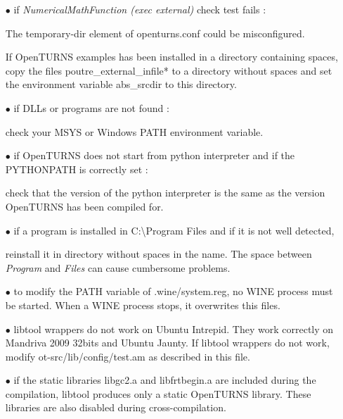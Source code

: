 \begin{itemize}
\item[$\bullet$]   if \emph{NumericalMathFunction (exec external)} check test fails :

The temporary-dir element of openturns.conf could be misconfigured.

If OpenTURNS examples has been installed in a directory containing spaces, copy the files poutre\_external\_infile* to a directory without spaces and set the environment variable abs\_srcdir to this directory.

\item[$\bullet$]   if DLLs or programs are not found :

check your MSYS or Windows PATH environment variable.
\item[$\bullet$]   if OpenTURNS does not start from python interpreter and if the PYTHONPATH is correctly set :

check that the version of the python interpreter is the same as the version OpenTURNS has been compiled for.
\item[$\bullet$]   if a program is installed in C:\textbackslash Program Files and if it is not well detected,

reinstall it in directory without spaces in the name. The space between \emph{Program} and \emph{Files} can cause cumbersome problems.

\item[$\bullet$]   to modify the PATH variable of .wine/system.reg, no WINE process must be started. When a WINE process stops, it overwrites this files.

\item[$\bullet$]   libtool wrappers do not work on Ubuntu Intrepid. They work correctly on Mandriva 2009 32bits and Ubuntu Jaunty. If libtool wrappers do not work, modify ot-src/lib/config/test.am as described in this file.

\item[$\bullet$]   if the static libraries libgc2.a and libfrtbegin.a are included during the compilation, libtool produces only a static OpenTURNS library. These libraries are also disabled during cross-compilation.

\end{itemize}
